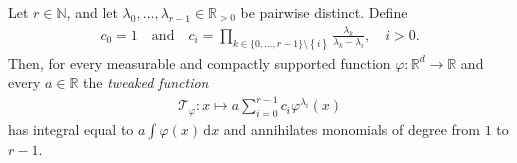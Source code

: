 \begin{lemma}[Tweaking]\label{tweaking-lemma}
    Let \(r \in \mathbb{N}\), and let \(\lambda_0, \ldots,\lambda_{r-1} \in \mathbb{R}_{>0}\) be pairwise distinct. Define 
    \begin{align*}
        c_0 = 1 \quad \text{and} \quad 
        c_i = \prod_{k \in \{0, \ldots,r-1\} \setminus\left\{ i \right\} } \frac{\lambda_k}{\lambda_k - \lambda_i}, \quad i > 0.
    \end{align*}
    Then, for every measurable and compactly supported function \(\varphi: \mathbb{R}^d \to \mathbb{R}\) and every \(a \in \mathbb{R}\) the \emph{tweaked function}  
    \begin{align*}
        \mathcal{T}_{\varphi}: x \mapsto a\sum^{r-1}_{i=0}c_i\varphi^{\lambda_i}(x)
    \end{align*}
    has integral equal to \(a \int \varphi(x) \, \mathrm{d}x\) and annihilates monomials of degree from \(1\) to \(r-1\).
\end{lemma}

